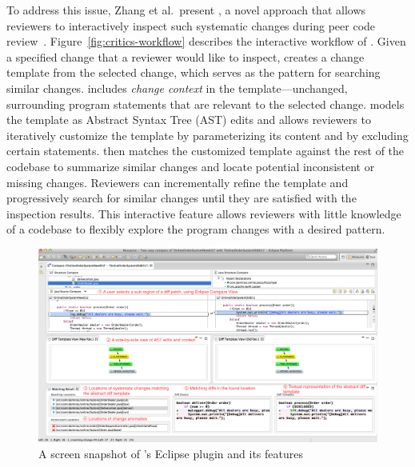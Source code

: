 \documentclass[runningheads,a4paper]{llncs}
\begin{document}
To address this issue, Zhang et al.~present {\critics}, a novel approach that allows reviewers to interactively inspect such systematic changes during peer code review~\cite{zhang2015interactive}. Figure~\ref{fig:critics-workflow} describes the interactive workflow of {\critics}. Given a specified change that a reviewer would like to inspect, {\critics} creates a change template from the selected change, which serves as the pattern for searching similar changes. {\critics} includes {\em change context} in the template---unchanged, surrounding program statements that are relevant to the selected change. {\critics} models the template as Abstract Syntax Tree (AST) edits and allows reviewers to iteratively customize the template by parameterizing its content and by excluding certain statements. {\critics} then matches the customized template against the rest of the codebase to summarize similar changes and locate potential inconsistent or missing changes. Reviewers can incrementally refine the template and progressively search for similar changes until they are satisfied with the inspection results. This interactive feature allows reviewers with little knowledge of a codebase to flexibly explore the program changes with a desired pattern.



\begin{figure}[ht]
 \centering
 \includegraphics[width=\textwidth]{images/critics-UI.pdf}
 \caption{A screen snapshot of {\critics}'s Eclipse plugin and its features}
 \label{fig:critics-UI}
\end{figure}
\end{document}
